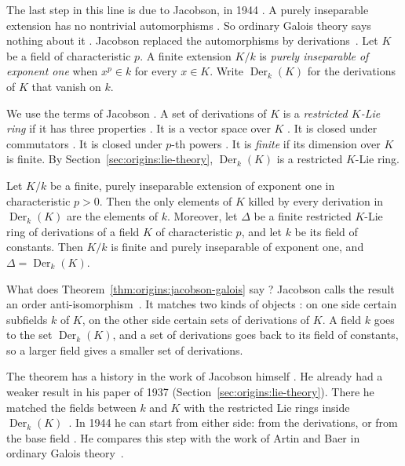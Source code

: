 The last step in this line is due to Jacobson, in 1944 \cite{Jacobson1944}. A
purely inseparable extension has no nontrivial automorphisms
\cite{Jacobson1944}. So ordinary Galois theory says nothing about it
\cite{Jacobson1944}. Jacobson replaced the automorphisms by
derivations~\cite{Jacobson1944}. Let $K$ be a field of characteristic $p$. A
finite extension $K/k$ is \emph{purely inseparable of exponent one} when $x^p
\in k$ for every $x \in K$. Write $\operatorname{Der}_k(K)$ for the
derivations of $K$ that vanish on $k$.

We use the terms of Jacobson \cite[Theorem~1, p.~207]{Jacobson1937}. A set of
derivations of $K$ is a \emph{restricted $K$-Lie ring} if it has three
properties \cite[Theorem~1, p.~207]{Jacobson1937}. It is a vector space over
$K$ \cite[Theorem~1, p.~207]{Jacobson1937}. It is closed under commutators
\cite[Theorem~1, p.~207]{Jacobson1937}. It is closed under $p$-th powers
\cite[Theorem~1, p.~207]{Jacobson1937}. It is \emph{finite} if its dimension
over $K$ is finite. By Section~\ref{sec:origins:lie-theory},
$\operatorname{Der}_k(K)$ is a restricted $K$-Lie ring.

\begin{theorem}\label{thm:origins:jacobson-galois}
Let $K/k$ be a finite, purely inseparable extension of exponent one in
characteristic $p > 0$. Then the only elements of $K$ killed by every
derivation in $\operatorname{Der}_k(K)$ are the elements of $k$. Moreover,
let $\Delta$ be a finite restricted $K$-Lie ring of derivations of a field
$K$ of characteristic $p$, and let $k$ be its field of constants. Then $K/k$
is finite and purely inseparable of exponent one, and
$\Delta = \operatorname{Der}_k(K)$.
\end{theorem}

What does Theorem~\ref{thm:origins:jacobson-galois} say
\cite[p.~645]{Jacobson1944}? Jacobson calls the result an order
anti-isomorphism~\cite[p.~645]{Jacobson1944}. It matches two kinds of objects
\cite[p.~645]{Jacobson1944}: on one side certain subfields $k$ of $K$, on the
other side certain sets of derivations of $K$. A field $k$ goes to the set
$\operatorname{Der}_k(K)$, and a set of derivations goes back to its field of
constants, so a larger field gives a smaller set of derivations.

The theorem has a history in the work of Jacobson himself
\cite[p.~645]{Jacobson1944}. He already had a weaker result in his paper of
1937 (Section~\ref{sec:origins:lie-theory}). There he matched the fields
between $k$ and $K$ with the restricted Lie rings inside
$\operatorname{Der}_k(K)$~\cite[p.~220]{Jacobson1937}. In 1944 he can start
from either side: from the derivations, or from the base field
\cite[p.~645]{Jacobson1944}. He compares this step with the work of Artin and
Baer in ordinary Galois theory~\cite[p.~645]{Jacobson1944}.

